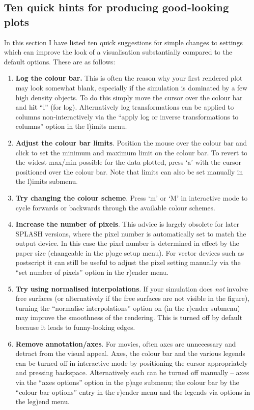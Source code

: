 \documentclass[a4paper,10pt]{article}
\newcommand{\splash}{\textsc{SPLASH }}
\begin{document}
 
\subsection{Ten quick hints for producing good-looking plots}
In this section I have listed ten quick suggestions for simple changes to settings which can improve the look of a visualisation substantially compared to the default options. These are as follows:
\begin{enumerate}
\item {\bf Log the colour bar.} This is often the reason why your first rendered plot may look somewhat blank, especially if the simulation is dominated by a few high density objects. To do this simply move the cursor over the colour bar and hit ``l'' (for log). Alternatively log transformations can be applied to columns non-interactively via the ``apply log or inverse transformations to columns'' option in the l)imits menu.
\item {\bf Adjust the colour bar limits}. Position the mouse over the colour bar and click to set the minimum and maximum limit on the colour bar. To revert to the widest max/min possible for the data plotted, press `a' with the cursor positioned over the colour bar. Note that limits can also be set manually in the l)imits submenu.
\item {\bf Try changing the colour scheme}. Press `m' or `M' in interactive mode to cycle forwards or backwards through the available colour schemes.
\item {\bf Increase the number of pixels}. This advice is largely obsolete for later \splash versions, where the pixel number is automatically set to match the output device. In this case the pixel number is determined in effect by the paper size (changeable in the p)age setup menu). For vector devices such as postscript it can still be useful to adjust the pixel setting manually via the ``set number of pixels'' option in the r)ender menu.
\item {\bf Try using normalised interpolations}. If your simulation does \emph{not} involve free surfaces (or alternatively if the free surfaces are not visible in the figure), turning the ``normalise interpolations'' option on (in the r)ender submenu) may improve the smoothness of the rendering. This is turned off by default because it leads to funny-looking edges.
\item {\bf Remove annotation/axes}. For movies, often axes are unnecessary and detract from the visual appeal. Axes, the colour bar and the various legends can be turned off in interactive mode by positioning the cursor appropriately and pressing backspace. Alternatively each can be turned off manually -- axes via the ``axes options'' option in the p)age submenu; the colour bar by the ``colour bar options'' entry in the r)ender menu and the legends via options in the leg)end menu.

\end{enumerate}
\end{document}
